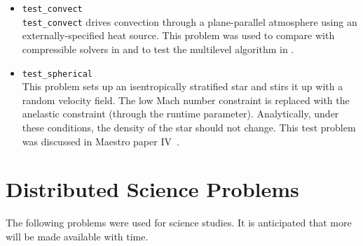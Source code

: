 \begin{itemize}
\item {\tt test\_convect} \\[-3mm]

{\tt test\_convect} drives convection through a plane-parallel
atmosphere using an externally-specified heat source.  This problem
was used to compare with compressible solvers in \cite{lowMach3}
and to test the multilevel algorithm in \cite{multilevel}.

\item {\tt test\_spherical} \\[-3mm]

This problem sets up an isentropically stratified star and stirs it up
with a random velocity field.  The low Mach number constraint is
replaced with the anelastic constraint (through
the  runtime parameter).  Analytically, under
these conditions, the density of the star should not change.  This
test problem was discussed in Maestro paper IV~\cite{lowMach4}.


\end{itemize}


\section{Distributed Science Problems}

The following problems were used for science studies.  It is
anticipated that more will be made available with time.

